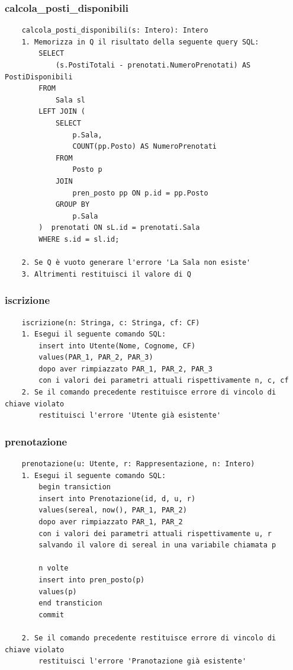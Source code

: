 \documentclass[12pt, letterpaper]{article}
\begin{document}
\subsubsection{calcola\_posti\_disponibili}
\begin{verbatim}
    calcola_posti_disponibili(s: Intero): Intero
    1. Memorizza in Q il risultato della seguente query SQL:
        SELECT 
            (s.PostiTotali - prenotati.NumeroPrenotati) AS PostiDisponibili
        FROM 
            Sala sl
        LEFT JOIN (
            SELECT 
                p.Sala,
                COUNT(pp.Posto) AS NumeroPrenotati
            FROM 
                Posto p
            JOIN 
                pren_posto pp ON p.id = pp.Posto
            GROUP BY 
                p.Sala
        )  prenotati ON sL.id = prenotati.Sala 
        WHERE s.id = sl.id;

    2. Se Q è vuoto generare l'errore 'La Sala non esiste'
    3. Altrimenti restituisci il valore di Q
\end{verbatim}
\subsubsection{iscrizione}
\begin{verbatim}
    iscrizione(n: Stringa, c: Stringa, cf: CF)
    1. Esegui il seguente comando SQL:
        insert into Utente(Nome, Cognome, CF)
        values(PAR_1, PAR_2, PAR_3)
        dopo aver rimpiazzato PAR_1, PAR_2, PAR_3 
        con i valori dei parametri attuali rispettivamente n, c, cf
    2. Se il comando precedente restituisce errore di vincolo di chiave violato
        restituisci l'errore 'Utente già esistente'
\end{verbatim}
\subsubsection{prenotazione}
\begin{verbatim}
    prenotazione(u: Utente, r: Rappresentazione, n: Intero)
    1. Esegui il seguente comando SQL:
        begin transiction 
        insert into Prenotazione(id, d, u, r)
        values(sereal, now(), PAR_1, PAR_2)
        dopo aver rimpiazzato PAR_1, PAR_2 
        con i valori dei parametri attuali rispettivamente u, r
        salvando il valore di sereal in una variabile chiamata p

        n volte 
        insert into pren_posto(p)
        values(p)
        end transticion 
        commit

    2. Se il comando precedente restituisce errore di vincolo di chiave violato
        restituisci l'errore 'Pranotazione già esistente'

\end{verbatim}
\end{document}
